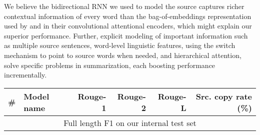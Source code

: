\documentclass[11pt]{article}
\begin{document}
We believe the bidirectional RNN we used to model the source captures richer contextual information of every word than the bag-of-embeddings representation used by  and  in their convolutional attentional encoders, which might explain our superior performance. Further, explicit modeling of important information such as multiple source sentences, word-level linguistic features, using the switch mechanism to point to source words when needed, and hierarchical attention, solve specific problems in summarization, each boosting performance incrementally. 





\begin{table*}
\begin{center}
{\small
\begin{tabular}{|r|l|r|r|r|r|}
\hline
{\bf \#} &  {\bf Model name} & {\bf Rouge-1} & {\bf Rouge-2} & {\bf Rouge-L} & {\bf Src. copy rate (\%)}\\
\hline


\hline





\hline
\hline
 \multicolumn{6}{|c|}{Full length F1 on our internal test set}  \\
\hline


\end{tabular}}
\end{center}
\end{table*}
\end{document}
